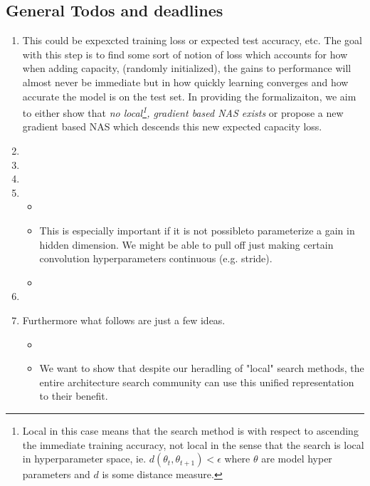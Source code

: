 \documentclass[12pt]{article}
\begin{document}
\subsection{General Todos and deadlines}
\begin{enumerate}
	\item {} This could be expexcted training loss or expected test accuracy, etc. The goal with this step is to find some sort of notion of loss which accounts for how when adding capacity, (randomly initialized), the gains to performance  will almost never be immediate but in how quickly learning converges and how accurate the model is on the test set.  In providing the formalizaiton, we aim to either show that \emph{no local\footnote{Local in this case means that the search method is with respect to ascending the immediate training accuracy, not local in the sense that the search is local in hyperparameter space, ie. $d(\theta_t, \theta_{t+1}) < \epsilon$ where $\theta$ are model hyper parameters and $d$ is some distance measure.}, gradient based NAS exists} or propose a new gradient based NAS which descends this new expected capacity loss.
	\item {}
	\item {}
	\item {}
	\item {}
	\begin{itemize}
		\item {}
		\item {} This is especially important if it is not possibleto parameterize a gain in hidden dimension. We might be able to pull off just making certain convolution hyperparameters continuous (e.g. stride).
		\item {}
	\end{itemize}

	\item {}
	\item {} Furthermore what follows are just a few ideas.
	\begin{itemize}
		\item {}
		\item {} We want to show that despite our heradling of "local" search methods, the entire architecture search community can use this unified representation to their benefit. 


\end{itemize}
\end{enumerate}
\end{document}
